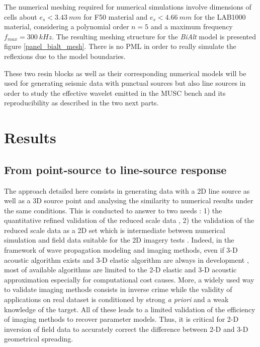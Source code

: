 \documentclass[manuscript,revised]{geophysics}
\newcommand{\twod}{2-D }
\newcommand{\thrd}{3-D }
\newcommand{\bialt}{\textit{BiAlt} }
\begin{document}
\noindent The numerical meshing required for numerical simulations involve dimensions of cells about $e_{s}<3.43\ mm$ for F50 material and $e_{s}<4.66\ mm$ for the LAB1000 material, considering a polynomial order $n=5$ and a maximum frequency $f_{max}=300\ kHz$. The resulting meshing structure for the \bialt model is presented figure \ref{panel_bialt_mesh}.
There is no PML in order to really simulate the reflexions due to the model boundaries.

\noindent These two resin blocks as well as their corresponding numerical models will be used for generating seismic data with punctual sources but also line sources in order to study the effective wavelet emitted in the MUSC bench and its reproducibility as described in the two next parts.

\section{Results}

\subsection{From point-source to line-source response}


\noindent The approach detailed here consists in generating data with a 2D line source as well as a 3D source point and analysing the similarity to numerical results under the same conditions. This is conducted to answer to two needs : 1) the quantitative refined validation of the reduced scale data , 2) the validation of the reduced scale data as a 2D set which is intermediate between numerical simulation and field data suitable for the 2D imagery tests . Indeed, in the framework of wave propagation modeling and imaging methods, even if \thrd acoustic algorithm exists \citep{benhadjali_FWI_2008,plessix_FWI_2010} and \thrd elastic algorithm are always in development \citep{castellanos_AMD_2011,Borisov_FWI_2015}, most of available algorithms are limited to the \twod elastic and \thrd acoustic approximation especially for computational cost causes. More, a widely used way to validate imaging methods consists in inverse crime while the validity of applications on real dataset is conditioned by strong \textit{a priori} and a weak knowledge of the target. All of these leads to a limited validation of the efficiency of imaging methods to recover parameter models. Thus, it is critical for \twod inversion of field data to accurately correct the difference between \twod and \thrd geometrical spreading.
\end{document}
